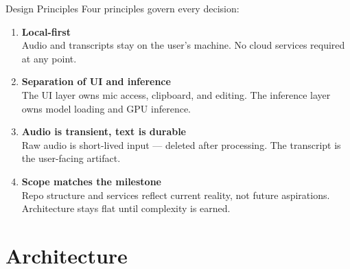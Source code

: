 \documentclass{beamer}
\begin{document}
\begin{frame}{Design Principles}
    Four principles govern every decision:

    \vspace{0.4em}
    \begin{enumerate}
        \item \textbf{Local-first}\\
              Audio and transcripts stay on the user's machine.
              No cloud services required at any point.

        \vspace{0.2em}
        \item \textbf{Separation of UI and inference}\\
              The UI layer owns mic access, clipboard, and editing.
              The inference layer owns model loading and GPU inference.

        \vspace{0.2em}
        \item \textbf{Audio is transient, text is durable}\\
              Raw audio is short-lived input --- deleted after processing.
              The transcript is the user-facing artifact.

        \vspace{0.2em}
        \item \textbf{Scope matches the milestone}\\
              Repo structure and services reflect current reality,
              not future aspirations. Architecture stays flat until
              complexity is earned.
    \end{enumerate}
\end{frame}


\section{Architecture}
\end{document}
